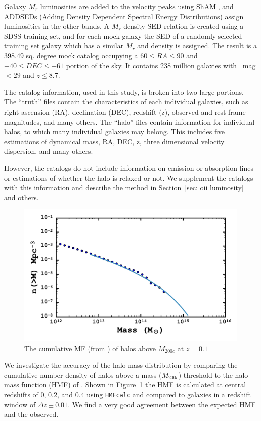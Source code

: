 \documentclass[fleqn,usenatbib]{mnras}
\begin{document}
Galaxy $M_r$ luminosities are added to the velocity peaks using ShAM \citep{Reddick2013}, and ADDSEDs (Adding Density Dependent Spectral Energy Distributions) assign luminosities in the other bands. A $M_r$-density-SED relation is created using a SDSS training set, and for each mock galaxy the SED of a randomly selected training set galaxy which has a similar $M_r$ and density is assigned. The result is a 398.49 sq. degree mock catalog occupying a $60 \leq RA \leq 90$ and $-40 \leq DEC \leq -61$ portion of the sky. It contains 238 million galaxies with \sdssr\ mag $< 29$ and $z \leq 8.7$.

The catalog information, used in this study, is broken into two large portions. The ``truth'' files contain the characteristics of each individual galaxies, such as right ascension (RA), declination (DEC), redshift (z), observed and rest-frame magnitudes, and many others. The ``halo'' files contain information for individual halos, to which many individual galaxies may belong. This includes five estimations of dynamical mass, RA, DEC, z, three dimensional velocity dispersion, and many others.

However, the catalogs do not include information on emission or absorption lines or estimations of whether the halo is relaxed or not. We supplement the catalogs with this information and describe the method in Section~\ref{sec: oii luminosity} and others.

\begin{figure} 
	\includegraphics[width=\columnwidth]{figures/hmf.pdf} 
	\caption{The cumulative MF (from \citealt{Tinker2008}) of halos above $M_{200c}$ at $z=0.1$} 
	\label{fig: hmf} 
\end{figure}

We investigate the accuracy of the halo mass distribution by comparing the cumulative number density of halos above a mass ($M_{200c}$) threshold to the halo mass function (HMF) of \cite{Tinker2008}. Shown in Figure~\ref{fig: hmf} the HMF is calculated at central redshifts of 0, 0.2, and 0.4 using {\tt HMFcalc} \citep{Murray2013} and compared to galaxies in a redshift window of $\Delta z\pm0.01$. We find a very good agreement between the expected HMF and the observed. 
\end{document}
